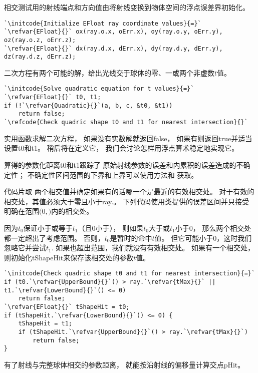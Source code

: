 相交测试用的射线端点和方向值由将射线变换到物体空间的浮点误差界初始化。
\begin{lstlisting}
`\initcode{Initialize EFloat ray coordinate values}{=}`
`\refvar{EFloat}{}` ox(ray.o.x, oErr.x), oy(ray.o.y, oErr.y), oz(ray.o.z, oErr.z);
`\refvar{EFloat}{}` dx(ray.d.x, dErr.x), dy(ray.d.y, dErr.y), dz(ray.d.z, dErr.z);
\end{lstlisting}

二次方程有两个可能的解，给出光线交于球体的零、一或两个非虚数$t$值。
\begin{lstlisting}
`\initcode{Solve quadratic equation for t values}{=}`
`\refvar{EFloat}{}` t0, t1;
if (!`\refvar{Quadratic}{}`(a, b, c, &t0, &t1))
    return false;
`\refcode{Check quadric shape t0 and t1 for nearest intersection}{}`
\end{lstlisting}

实用函数求解二次方程，
如果没有实数解就返回{\ttfamily false}，
如果有则返回{\ttfamily true}并适当设置{\ttfamily t0}和{\ttfamily t1}。
稍后将在定义它，
我们会讨论怎样用浮点算术稳定地实现它。

算得的参数化距离{\ttfamily t0}和{\ttfamily t1}跟踪了
原始射线参数的误差和内累积的误差造成的不确定性；
不确定性区间范围的下界和上界可以使用方法和
获取。

代码片取
两个相交值并确定如果有的话哪一个是最近的有效相交处。
对于有效的相交处，其值必须大于零且小于{\ttfamily ray.}。
下列代码使用类提供的误差区间并只接受
明确在范围$(0,$$)$内的相交处。

因为$t_0$保证小于或等于$t_1$（且$0$小于），
则如果$t_0$大于或$t_1$小于$0$，
那么两个相交处都一定超出了考虑范围。
否则，$t_0$是暂时的命中$t$值。
但它可能小于$0$，这时我们忽略它并尝试$t_1$.
如果也超出范围，我们就没有有效相交处。
如果有一个相交处，则初始化{\ttfamily tShapeHit}来保存该相交处的参数$t$值。
\begin{lstlisting}
`\initcode{Check quadric shape t0 and t1 for nearest intersection}{=}`
if (t0.`\refvar{UpperBound}{}`() > ray.`\refvar{tMax}{}` || t1.`\refvar{LowerBound}{}`() <= 0)
    return false;
`\refvar{EFloat}{}` tShapeHit = t0;
if (tShapeHit.`\refvar{LowerBound}{}`() <= 0) {
    tShapeHit = t1;
    if (tShapeHit.`\refvar{UpperBound}{}`() > ray.`\refvar{tMax}{}`)
        return false;
}
\end{lstlisting}
有了射线与完整球体相交的参数距离，
就能按沿射线的偏移量计算交点{\ttfamily pHit}。

